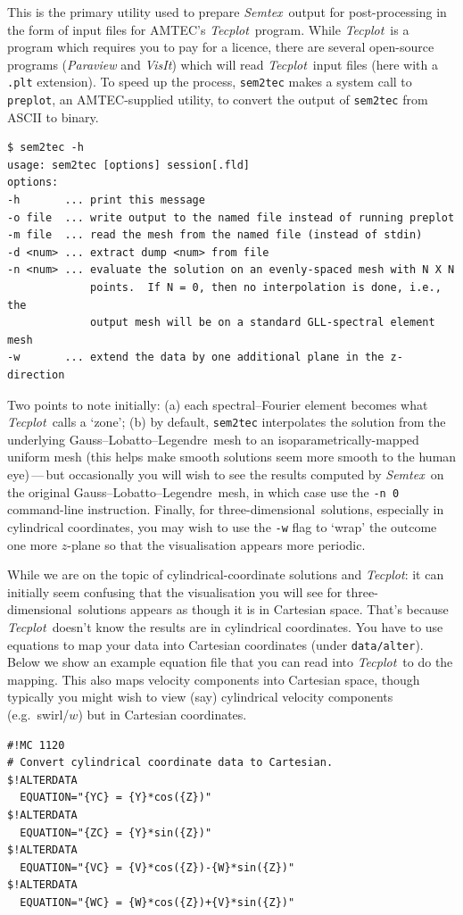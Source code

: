 \documentclass[11pt]{report}
\newcommand{\Semtex}{\emph{Semtex}} \newcommand{\Dog}{\emph{Dog}}
\newcommand{\Tecplot}{\emph{Tecplot}}
\newcommand\threed{three-di\-men\-sion\-al}
\newcommand{\eg}{e.g.\ } \newcommand{\CC}{\mathrm{c.c.}}
\newcommand\GLL{Gauss--Lobatto--Legendre}
\begin{document}
This is the primary utility used to prepare \Semtex\ output for
post-processing in the form of input files for AMTEC's
\Tecplot\ program.  While \Tecplot\ is a program which requires you to
pay for a licence, there are several open-source programs
(\emph{Paraview} and \emph{VisIt}) which will read \Tecplot\ input
files (here with a \verb|.plt| extension).  To speed up the process,
\verb|sem2tec| makes a system call to \verb|preplot|, an
AMTEC-supplied utility, to convert the output of \verb|sem2tec| from
ASCII to binary.
%
{\small
\begin{verbatim}
$ sem2tec -h
usage: sem2tec [options] session[.fld]
options:
-h       ... print this message
-o file  ... write output to the named file instead of running preplot
-m file  ... read the mesh from the named file (instead of stdin)
-d <num> ... extract dump <num> from file
-n <num> ... evaluate the solution on an evenly-spaced mesh with N X N
             points.  If N = 0, then no interpolation is done, i.e., the
             output mesh will be on a standard GLL-spectral element mesh
-w       ... extend the data by one additional plane in the z-direction
\end{verbatim}
}
%
Two points to note initially: (a) each spectral--Fourier element
becomes what \Tecplot\ calls a `zone'; (b) by default, \verb|sem2tec|
interpolates the solution from the underlying \GLL\ mesh to an
isoparametrically-mapped uniform mesh (this helps make smooth
solutions seem more smooth to the human eye)\,---\,but occasionally
you will wish to see the results computed by \Semtex\ on the original
\GLL\ mesh, in which case use the \verb|-n 0| command-line
instruction. Finally, for \threed\ solutions, especially in
cylindrical coordinates, you may wish to use the \verb|-w| flag to
`wrap' the outcome one more $z$-plane so that the visualisation
appears more periodic.

While we are on the topic of cylindrical-coordinate solutions and
\Tecplot: it can initially seem confusing that the visualisation you
will see for \threed\ solutions appears as though it is in Cartesian
space.  That's because \Tecplot\ doesn't know the results are in
cylindrical coordinates.  You have to use equations to map your data
into Cartesian coordinates (under \verb|data/alter|).  Below we show
an example equation file that you can read into \Tecplot\ to do the
mapping.  This also maps velocity components into Cartesian space,
though typically you might wish to view (say) cylindrical velocity
components (\eg swirl/$w$) but in Cartesian coordinates.
%
{\small
\begin{verbatim}
#!MC 1120
# Convert cylindrical coordinate data to Cartesian.
$!ALTERDATA
  EQUATION="{YC} = {Y}*cos({Z})"
$!ALTERDATA
  EQUATION="{ZC} = {Y}*sin({Z})"
$!ALTERDATA
  EQUATION="{VC} = {V}*cos({Z})-{W}*sin({Z})"
$!ALTERDATA
  EQUATION="{WC} = {W}*cos({Z})+{V}*sin({Z})"
\end{verbatim}
}
\end{document}
